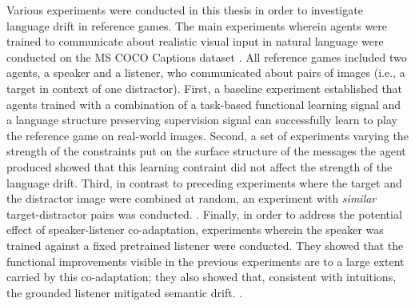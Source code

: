 Various experiments were conducted in this thesis in order to investigate language drift in reference games. The main experiments wherein agents were trained to communicate about realistic visual input in natural language were conducted on the MS COCO Captions dataset \parencite{chen2015microsoft}. All reference games included two agents, a speaker and a listener, who communicated about pairs of images (i.e., a target in context of one distractor).
First, a baseline experiment established that agents trained with a combination of a task-based functional learning signal and a language structure preserving supervision signal can successfully learn to play the reference game on real-world images. Second, a set of experiments varying the strength of the constraints put on the surface structure of the messages the agent produced showed that this learning contraint did not affect the strength of the language drift. Third, in contrast to preceding experiments where the target and the distractor image were combined at random, an experiment with \emph{similar} target-distractor pairs was conducted. . Finally, in order to address the potential effect of speaker-listener co-adaptation, experiments wherein the speaker was trained against a fixed pretrained listener were conducted. They showed that the functional improvements visible in the previous experiments are to a large extent carried by this co-adaptation; they also showed that, consistent with intuitions, the grounded listener mitigated semantic drift. . 

